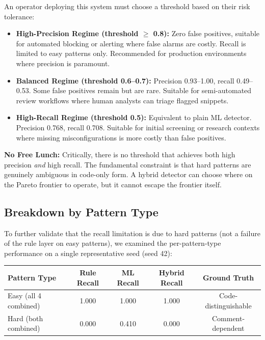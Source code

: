 An operator deploying this system must choose a threshold based on their risk tolerance:

\begin{itemize}
  \item \textbf{High-Precision Regime (threshold $\geq$ 0.8):} Zero false positives, suitable for automated blocking or alerting where false alarms are costly. Recall is limited to easy patterns only. Recommended for production environments where precision is paramount.
  
  \item \textbf{Balanced Regime (threshold 0.6--0.7):} Precision 0.93--1.00, recall 0.49--0.53. Some false positives remain but are rare. Suitable for semi-automated review workflows where human analysts can triage flagged snippets.
  
  \item \textbf{High-Recall Regime (threshold 0.5):} Equivalent to plain ML detector. Precision 0.768, recall 0.708. Suitable for initial screening or research contexts where missing misconfigurations is more costly than false positives.
\end{itemize}

\textbf{No Free Lunch:} Critically, there is no threshold that achieves both high precision \emph{and} high recall. The fundamental constraint is that hard patterns are genuinely ambiguous in code-only form. A hybrid detector can choose where on the Pareto frontier to operate, but it cannot escape the frontier itself.

\subsection{Breakdown by Pattern Type}
\label{sec:pattern-breakdown}

To further validate that the recall limitation is due to hard patterns (not a failure of the rule layer on easy patterns), we examined the per-pattern-type performance on a single representative seed (seed 42):

\begin{center}
\begin{tabular}{lcccc}
\hline
Pattern Type & Rule Recall & ML Recall & Hybrid Recall & Ground Truth \\
\hline
Easy (all 4 combined) & 1.000 & 1.000 & 1.000 & Code-distinguishable \\
Hard (both combined) & 0.000 & 0.410 & 0.000 & Comment-dependent \\
\hline
\end{tabular}
\end{center}

